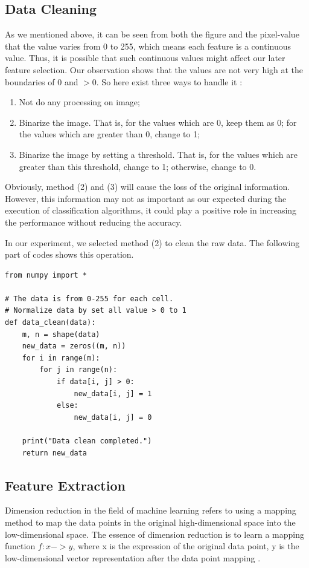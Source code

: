 \documentclass[sigconf]{acmart}
\begin{document}
\subsection{Data Cleaning}

As we mentioned above, it can be seen from both the figure and the pixel-value that the value varies from 0 to 255, which means each feature is a continuous value. Thus, it is possible that such continuous values might affect our later feature selection. Our observation shows that the values are not very high at the boundaries of 0 and $>0$. So here exist three ways to handle it \cite{data_clean}:
\begin{enumerate}
    \item Not do any processing on image;
    \item Binarize the image. That is, for the values which are 0, keep them as 0; for the values which are greater than 0, change to 1;
    \item Binarize the image by setting a threshold. That is, for the values which are greater than this threshold, change to 1; otherwise, change to 0.
\end{enumerate}

Obviously, method (2) and (3) will cause the loss of the original information. However, this information may not as important as our expected during the execution of classification algorithms, it could play a positive role in increasing the performance without reducing the accuracy.

In our experiment, we selected method (2) to clean the raw data. The following part of codes shows this operation.
\begin{lstlisting}
from numpy import *

# The data is from 0-255 for each cell.
# Normalize data by set all value > 0 to 1
def data_clean(data):
    m, n = shape(data)
    new_data = zeros((m, n))
    for i in range(m):
        for j in range(n):
            if data[i, j] > 0:
                new_data[i, j] = 1
            else:
                new_data[i, j] = 0
                
    print("Data clean completed.")
    return new_data
\end{lstlisting}

\subsection{Feature Extraction}

Dimension reduction in the field of machine learning refers to using a mapping method to map the data points in the original high-dimensional space into the low-dimensional space. The essence of dimension reduction is to learn a mapping function \(f:x->y\), where x is the expression of the original data point, y is the low-dimensional vector representation after the data point mapping \cite{feature_extra}. 
\end{document}
